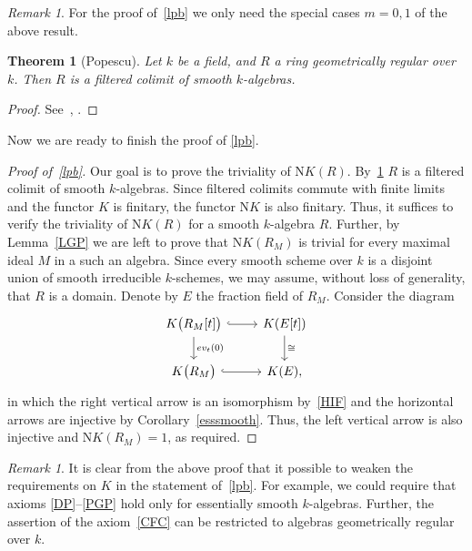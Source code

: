 \documentclass[oneside, 11pt]{amsart}
\numberwithin{equation}{section}
\newtheorem{theorem}[lemma]{Theorem}
\theoremstyle{definition}
\theoremstyle{definition}
\theoremstyle{remark}
\newtheorem{rem}[lemma]{Remark}
\begin{document}
\begin{rem}
For the proof of~\cref{lpb} we only need the special cases $m=0,1$ of the above result.
\end{rem}

\begin{theorem}[Popescu]
\label{popescu} Let $k$ be a field, and $R$ a ring geometrically regular over $k$. Then $R$ is a filtered colimit of smooth $k$-algebras. \end{theorem}
\begin{proof} See~\cite{Po85}, \cite[Theorem~1.1]{Sw98}.
\end{proof}

Now we are ready to finish the proof of \cref{lpb}. 
\begin{proof}[Proof of~\cref{lpb}]
Our goal is to prove the triviality of $\mathrm NK(R)$.
By~\cref{popescu} $R$ is a filtered colimit of smooth $k$-algebras.
Since filtered colimits commute with finite limits and the functor $K$ is finitary, the functor $\mathrm NK$ is also finitary.
Thus, it suffices to verify the triviality of $\mathrm NK(R)$ for a smooth $k$-algebra $R$.
Further, by Lemma~\ref{LGP} we are left to prove that $\mathrm NK(R_M)$ is trivial for every maximal ideal $M$ in a such an algebra.
Since every smooth scheme over $k$ is a disjoint union of smooth irreducible $k$-schemes, we may assume, without loss of generality, that $R$ is a domain.
Denote by $E$ the fraction field of $R_M$. Consider the diagram
\[\begin{tikzcd}
K\bigl(R_M[t]\bigr) \ar[hookrightarrow]{r} \ar{d}{ev_t(0)} & K(E[t]) \ar{d}{\cong}\\
K\bigl(R_M\bigr) \ar[hookrightarrow]{r} & K(E),
\end{tikzcd}\]
in which the right vertical arrow is an isomorphism by~\ref{HIF} and the horizontal arrows are injective by Corollary~\ref{esssmooth}.
Thus, the left vertical arrow is also injective and $\mathrm NK(R_M) = 1$, as required.
\end{proof}
\begin{rem}\label{rem:relax}
It is clear from the above proof that it possible to weaken the requirements on $K$ in the statement of~\cref{lpb}. For example, we could require that axioms \ref{DP}--\ref{PGP} hold only for essentially smooth $k$-algebras. Further, the assertion of the axiom~\ref{CFC} can be restricted to algebras geometrically regular over $k$.
\end{rem}
\end{document}
